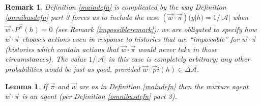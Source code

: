 \documentclass[twoside]{article}
\newtheorem{remark}[theorem]{Remark}
\newtheorem{lemma}[theorem]{Lemma}
\begin{document}
\begin{remark}
    Definition \ref{maindefn} is complicated by the way
    Definition \ref{omnibusdefn} part 3
    forces us to include the case
    $(\vec w\cdot\vec\pi)(y|h)=1/|\mathcal A|$ when
    $\vec w\cdot {P^{\vec\pi}}(h)=0$
    (see Remark \ref{impossibleremark}): we are obligated to specify how
    $\vec w\cdot\vec\pi$ chooses actions even in response to histories that
    are ``impossible'' for $\vec w\cdot\vec\pi$ (histories which contain actions that
    $\vec w\cdot\vec\pi$ would never take in those circumstances).
    The value $1/|\mathcal A|$ in this case is completely arbitrary;
    any other probabilities would be just as good,
    provided $\vec w\cdot\vec pi(h)\in\Delta\mathcal A$.
\end{remark}

\begin{lemma}
\label{mixturereallyisanagent}
    If $\vec\pi$ and $\vec w$ are as in Definition \ref{maindefn}
    then the mixture agent $\vec w\cdot\vec\pi$ is an agent
    (per Definition \ref{omnibusdefn} part 3).
\end{lemma}
\end{document}
